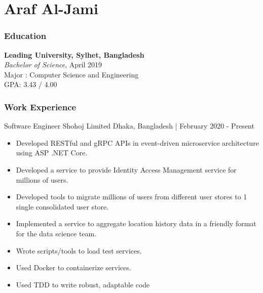 \documentclass{resumestyle}
\begin{document}
\large%

\part{Araf Al-Jami}

\section{Education}%

\textbf{Leading University, Sylhet, Bangladesh}\\%
\textit{Bachelor of Science}, April 2019\\%
Major : Computer Science and Engineering\\%
GPA: 3.43 / 4.00%

\section{Work Experience}%
    \worksubsection%
        {Software Engineer}%
        {Shohoj Limited}%
        {Dhaka, Bangladesh | February 2020 - Present}%
    
    \begin{itemize}[labelsep=4pt,leftmargin=*,topsep=5pt,partopsep=0pt,itemsep=1pt]%
        \item Developed RESTful and gRPC APIs in event-driven microservice architecture using ASP .NET Core.%
        \item Developed a service to provide Identity Access Management service for millions of users.%
        \item Developed tools to migrate millions of users from different user stores to 1 single consolidated user store.%
        \item Implemented a service to aggregate location history data in a friendly format for the data science team.%
        \item Wrote scripts/tools to load test services.%
        \item Used Docker to containerize services.%
        \item Used TDD to write robust, adaptable code%
    \end{itemize}%
\end{document}
